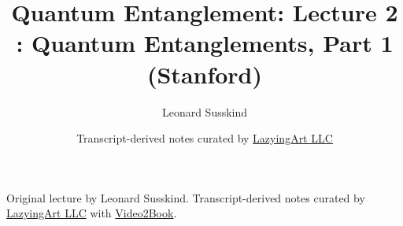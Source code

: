 \documentclass[11pt,oneside]{book}
\begin{document}
\frontmatter
\title{Quantum Entanglement: Lecture 2 : Quantum Entanglements, Part 1 (Stanford)}
\author{Leonard Susskind}
\date{Transcript-derived notes curated by \href{https://lazying.art}{LazyingArt LLC}}
\maketitle
\begin{center}
\small Original lecture by Leonard Susskind. Transcript-derived notes curated by \href{https://lazying.art}{LazyingArt LLC} with \href{https://github.com/lachlanchen/Video2Book}{Video2Book}.
\end{center}
\clearpage
\mainmatter

\end{document}
